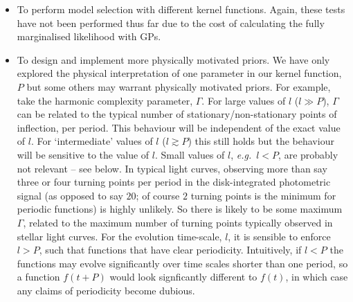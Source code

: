 \documentclass[useAMS, usenatbib, preprint, 12pt]{aastex}
\newcommand{\eg}{{\it e.g.}}
\begin{document}
\begin{itemize}
\item{To perform model selection with different kernel functions. Again, these
    tests have not been performed thus far due to the cost of calculating the
        fully marginalised likelihood with GPs.}
\item{To design and implement more physically motivated priors.
We have only explored the physical interpretation of one parameter in our
        kernel function, $P$ but some others may warrant physically motivated
        priors.
For example, take the harmonic complexity parameter, $\Gamma$.
        For large values of $l$ ($l\gg P$), $\Gamma$ can be related to the
        typical number of stationary/non-stationary points of inflection, per
        period.
        This behaviour will be independent of the exact value of $l$.
        For `intermediate' values of $l$ ($l\gtrsim P$) this still holds
        but the behaviour will be sensitive to the value of $l$.
        Small values of $l$, \eg\ $l<P$, are probably not relevant -- see
        below.
        In typical light curves, observing more than say three or four
        turning points per period in the disk-integrated photometric signal
        (as opposed to say $20$; of course $2$ turning points is the minimum
        for periodic functions) is highly unlikely.
        So there is likely to be some maximum $\Gamma$, related to the maximum
        number of turning points typically observed in stellar light curves.
For the evolution time-scale, $l$, it is sensible to enforce $l>P$, such that
        functions that have clear periodicity.
        Intuitively, if $l<P$ the functions may evolve significantly over time
        scales shorter than one period, so a function $f(t+P)$ would look
        signficantly different to $f(t)$, in which case any claims of
        periodicity become dubious.}

\end{itemize}
\end{document}
